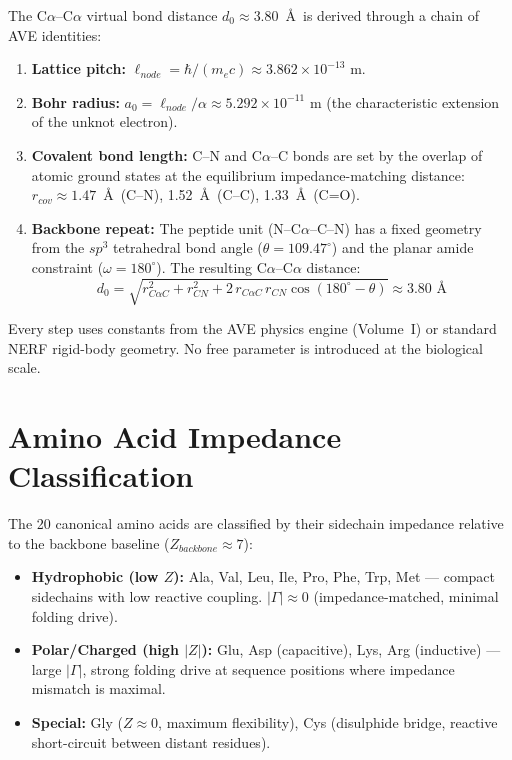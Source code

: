 The C$\alpha$--C$\alpha$ virtual bond distance $d_0 \approx 3.80$~\AA\ is derived through a chain of AVE identities:

\begin{enumerate}
    \item \textbf{Lattice pitch:} $\ell_{node} = \hbar / (m_e c) \approx 3.862 \times 10^{-13}$ m.
    \item \textbf{Bohr radius:} $a_0 = \ell_{node} / \alpha \approx 5.292 \times 10^{-11}$ m (the characteristic extension of the unknot electron).
    \item \textbf{Covalent bond length:} C--N and C$\alpha$--C bonds are set by the overlap of atomic ground states at the equilibrium impedance-matching distance: $r_{cov} \approx 1.47$~\AA\ (C--N), 1.52~\AA\ (C--C), 1.33~\AA\ (C=O).
    \item \textbf{Backbone repeat:} The peptide unit (N--C$\alpha$--C--N) has a fixed geometry from the $sp^3$ tetrahedral bond angle ($\theta = 109.47^\circ$) and the planar amide constraint ($\omega = 180^\circ$). The resulting C$\alpha$--C$\alpha$ distance:
    \begin{equation}
        d_0 = \sqrt{r_{C\alpha C}^2 + r_{CN}^2 + 2\, r_{C\alpha C}\, r_{CN} \cos(180^\circ - \theta)} \approx 3.80 \text{ \AA}
    \end{equation}
\end{enumerate}

Every step uses constants from the AVE physics engine (Volume~I) or standard NERF rigid-body geometry. No free parameter is introduced at the biological scale.

\section{Amino Acid Impedance Classification}

The 20 canonical amino acids are classified by their sidechain impedance relative to the backbone baseline ($Z_{backbone} \approx 7$):

\begin{itemize}
    \item \textbf{Hydrophobic (low $Z$):} Ala, Val, Leu, Ile, Pro, Phe, Trp, Met --- compact sidechains with low reactive coupling. $|\Gamma| \approx 0$ (impedance-matched, minimal folding drive).
    \item \textbf{Polar/Charged (high $|Z|$):} Glu, Asp (capacitive), Lys, Arg (inductive) --- large $|\Gamma|$, strong folding drive at sequence positions where impedance mismatch is maximal.
    \item \textbf{Special:} Gly ($Z \approx 0$, maximum flexibility), Cys (disulphide bridge, reactive short-circuit between distant residues).
\end{itemize}

